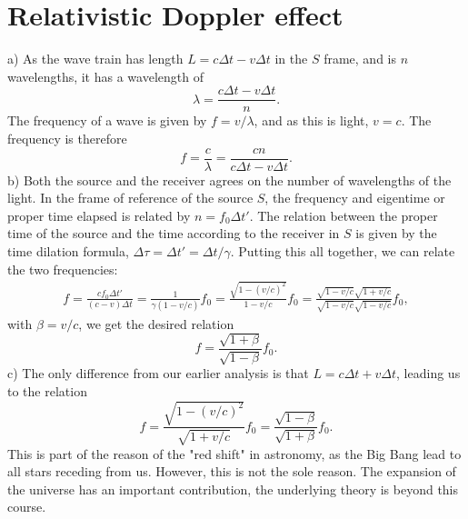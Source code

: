 \documentclass{article}
\begin{document}
    \section{Relativistic Doppler effect}
    a) As the wave train has length $L = c \Delta t - v \Delta t$ in the $S$ frame, and is $n$ wavelengths, it has a wavelength of 
    \begin{equation*}
        \lambda = \frac{c \Delta t - v \Delta t}{n}.
    \end{equation*}
    The frequency of a wave is given by $f = v / \lambda$, and as this is light, $v = c$. The frequency is therefore
    \begin{equation*}
        f = \frac{c}{\lambda} = \frac{cn}{c \Delta t - v \Delta t}.
    \end{equation*}
    b) Both the source and the receiver agrees on the number of wavelengths of the light. In the frame of reference of the source $S$, the frequency and eigentime or proper time elapsed is related by $n = f_0 \Delta t'$. The relation between the proper time of the source and the time according to the receiver in $S$ is given by the time dilation formula, $\Delta \tau = \Delta t' = \Delta t / \gamma$. Putting this all together, we can relate the two frequencies:
    \begin{align*}
        f = \frac{c f_0 \Delta t'}{(c - v)\Delta t} = \frac{1}{\gamma(1 - v/c)} f_0 = \frac{\sqrt{1 - (v/c)^2}}{1 - v/c} f_0 = \frac{\sqrt{1 - v/c}\sqrt{1 + v/c}}{\sqrt{1 - v/c}\sqrt{1 - v/c}}f_0,
    \end{align*} 
    with $\beta = v/c$, we get the desired relation
    \begin{equation*}
        f = \frac{\sqrt{1 + \beta}}{\sqrt{1 - \beta}}f_0.
    \end{equation*}
    c) The only difference from our earlier analysis is that $L = c \Delta t + v \Delta t$, leading us to the relation
    \begin{equation*}
        f = \frac{\sqrt{1 - (v/c)^2}}{\sqrt{1 + v/c}}f_0 = \frac{\sqrt{1 - \beta}}{\sqrt{1 + \beta}}f_0.
    \end{equation*}
    This is part of the reason of the "red shift" in astronomy, as the Big Bang lead to all stars receding from us. However, this is not the sole reason. The expansion of the universe has an important contribution, the underlying theory is beyond this course.
\end{document}
